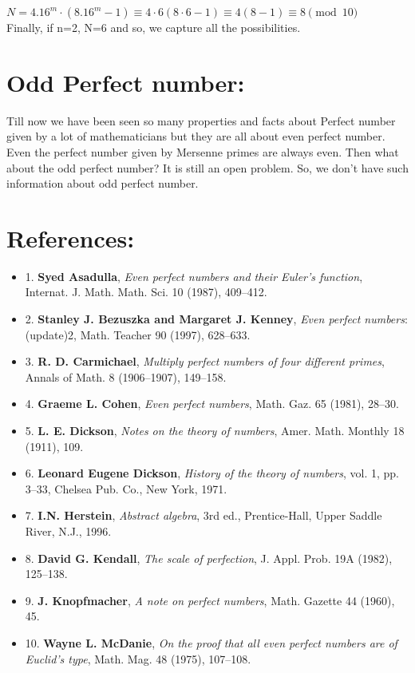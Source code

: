 \documentclass[12pt,,a4paper]{book}
\begin{document}
\(N = 4.16^m \cdot (8.16^m-1) \equiv 4 \cdot 6 (8 \cdot 6-1) \equiv 4(8-1) \equiv 8 \pmod{10}\)
 \\
Finally, if n=2, N=6 and so, we capture all the possibilities. \\
\section{Odd Perfect number:}

 Till now we have been seen so many properties and facts about Perfect number given by a lot of mathematicians but they are all about even perfect number. Even the perfect number given by Mersenne primes are always even. Then what about the odd perfect number? It is still an open problem. So, we don't have such information about odd perfect number.\\

\clearpage
 
\section*{References:}

\raggedright
\setlength{\itemsep}{0.5em}  %
\begin{itemize}
\item 1.  \textbf{Syed Asadulla},  \textit{Even perfect numbers and their Euler’s function}, Internat. J. Math. Math. Sci. 10 (1987), 409--412.

\item 2.  \textbf{Stanley J. Bezuszka and Margaret J. Kenney}, \textit{ Even perfect numbers}: (update)2, Math. Teacher 90 (1997), 628--633.

\item 3.  \textbf{R. D. Carmichael}, \textit{ Multiply perfect numbers of four different primes}, Annals of Math. 8 (1906--1907), 149--158.

\item 4.  \textbf{Graeme L. Cohen},  \textit{Even perfect numbers}, Math. Gaz. 65 (1981), 28--30.

\item 5.  \textbf{L. E. Dickson},  \textit{Notes on the theory of numbers}, Amer. Math. Monthly 18 (1911), 109.

\item 6.  \textbf{Leonard Eugene Dickson},  \textit{History of the theory of numbers}, vol. 1, pp. 3--33, Chelsea Pub. Co., New York, 1971.

\item 7.  \textbf{I.N. Herstein},  \textit{Abstract algebra}, 3rd ed., Prentice-Hall, Upper Saddle River, N.J., 1996.

\item 8.  \textbf{David G. Kendall},  \textit{The scale of perfection}, J. Appl. Prob. 19A (1982), 125--138.

\item 9.  \textbf{J. Knopfmacher}, \textit{ A note on perfect numbers}, Math. Gazette 44 (1960), 45.

\item 10. \textbf{ Wayne L. McDanie},  \textit{On the proof that all even perfect numbers are of Euclid’s type}, Math. Mag. 48 (1975), 107--108.
\end{itemize}
\end{document}
